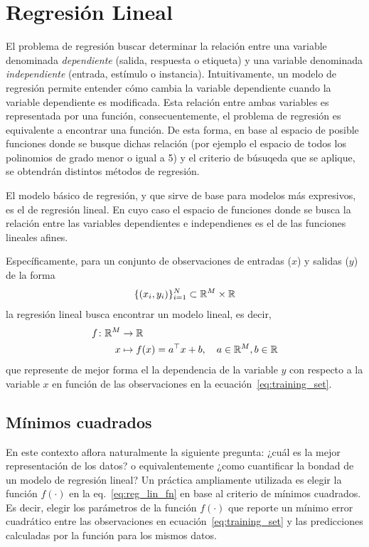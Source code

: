
\section{Regresión Lineal}

El problema de regresión buscar determinar la relación entre una variable denominada \emph{dependiente} (salida, respuesta o etiqueta) y una variable denominada \emph{independiente} (entrada, estímulo o instancia). Intuitivamente, un modelo de regresión permite entender cómo cambia la variable dependiente cuando la variable dependiente es modificada. Esta relación entre ambas variables es representada por una función, consecuentemente, el problema de regresión es equivalente a encontrar una función. De esta forma, en base al espacio de posible funciones donde se busque dichas relación (por ejemplo el espacio de todos los polinomios de grado menor o igual a 5) y el criterio de búsuqeda que se aplique, se obtendrán distintos métodos de regresión. 

El modelo básico de regresión, y que sirve de base para modelos más expresivos, es el de regresión lineal. En cuyo caso el espacio de funciones donde se busca la relación entre las variables dependientes e independienes es el de las funciones lineales afines. 

Específicamente, para un conjunto de observaciones de entradas ($x$) y salidas ($y$) de la forma
\begin{equation}
	\{(x_i,y_i)\}_{i=1}^N\subset {\mathbb R}^M \times {\mathbb R}
	\label{eq:training_set}
\end{equation}
la regresión lineal busca encontrar un modelo lineal, es decir,  
\begin{align}
  f \colon {\mathbb R}^M &\to {\mathbb R}\nonumber\\
  x &\mapsto f(x)=a^\top x + b,\quad a\in{\mathbb R}^M,b\in{\mathbb R}
 \label{eq:reg_lin_fn} 
\end{align}
que represente de mejor forma el la dependencia de la variable $y$ con respecto a la variable $x$ en función de las observaciones en la ecuación~\eqref{eq:training_set}.



\subsection{Mínimos cuadrados} %
\label{ssub:min_cuad}
En este contexto aflora naturalmente la siguiente pregunta: ¿cuál es la mejor representación de los datos? o equivalentemente ¿como cuantificar la bondad de un modelo de regresión lineal? Un práctica  ampliamente utilizada es elegir la función $f(\cdot)$ en la eq.~\eqref{eq:reg_lin_fn} en base al criterio de mínimos cuadrados. Es decir, elegir los parámetros de la función $f(\cdot)$ que reporte un mínimo error cuadrático entre las observaciones en ecuación~\eqref{eq:training_set} y las predicciones calculadas por la función para los mismos datos. 

